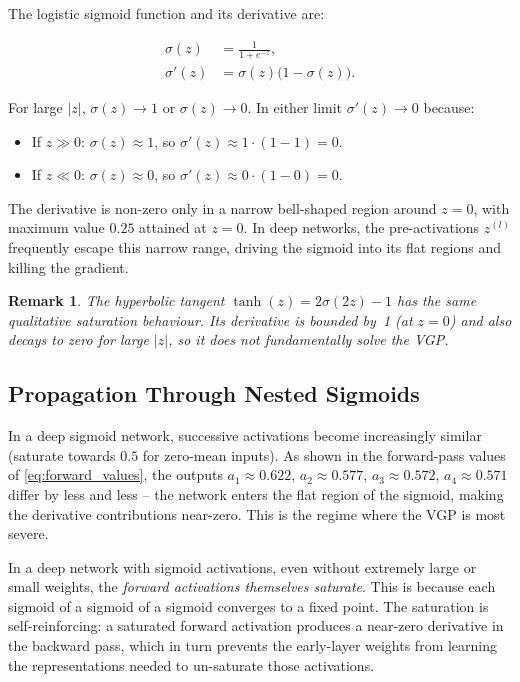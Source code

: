 \documentclass[12pt,a4paper]{article}
\newtheorem{remark}{Remark}[section]
\newcommand{\sigmoid}{\sigma}
\begin{document}
The logistic sigmoid function and its derivative are:

\begin{align}
  \sigmoid(z) &= \frac{1}{1 + e^{-z}}, \label{eq:sigmoid_def}\\[6pt]
  \sigmoid'(z) &= \sigmoid(z)\bigl(1 - \sigmoid(z)\bigr). \label{eq:sigmoid_prime}
\end{align}

For large $|z|$, $\sigmoid(z) \to 1$ or $\sigmoid(z) \to 0$.  In
either limit $\sigmoid'(z) \to 0$ because:

\begin{itemize}
  \item If $z \gg 0$: $\sigmoid(z) \approx 1$, so $\sigmoid'(z) \approx 1 \cdot (1-1) = 0$.
  \item If $z \ll 0$: $\sigmoid(z) \approx 0$, so $\sigmoid'(z) \approx 0 \cdot (1-0) = 0$.
\end{itemize}

The derivative is non-zero only in a narrow bell-shaped region around
$z = 0$, with maximum value $0.25$ attained at $z = 0$.  In deep
networks, the pre-activations $z^{(l)}$ frequently escape this narrow
range, driving the sigmoid into its flat regions and killing the
gradient.

\begin{remark}
\label{rem:tanh}
The hyperbolic tangent $\tanh(z) = 2\sigmoid(2z) - 1$ has the same
qualitative saturation behaviour.  Its derivative is bounded by~1
(at $z=0$) and also decays to zero for large $|z|$, so it does not
fundamentally solve the VGP.
\end{remark}

\subsection{Propagation Through Nested Sigmoids}
\label{subsec:nested_sigmoid}

In a deep sigmoid network, successive activations become increasingly
similar (saturate towards $0.5$ for zero-mean inputs).  As shown in
the forward-pass values of \cref{eq:forward_values}, the outputs
$a_1 \approx 0.622$, $a_2 \approx 0.577$, $a_3 \approx 0.572$,
$a_4 \approx 0.571$ differ by less and less -- the network enters the
flat region of the sigmoid, making the derivative contributions
near-zero.  This is the regime where the VGP is most severe.

\begin{warningbox}
In a deep network with sigmoid activations, even without extremely large
or small weights, the \emph{forward activations themselves saturate}.
This is because each sigmoid of a sigmoid of a sigmoid converges to a
fixed point.  The saturation is self-reinforcing: a saturated forward
activation produces a near-zero derivative in the backward pass,
which in turn prevents the early-layer weights from learning the
representations needed to un-saturate those activations.
\end{warningbox}
\end{document}
